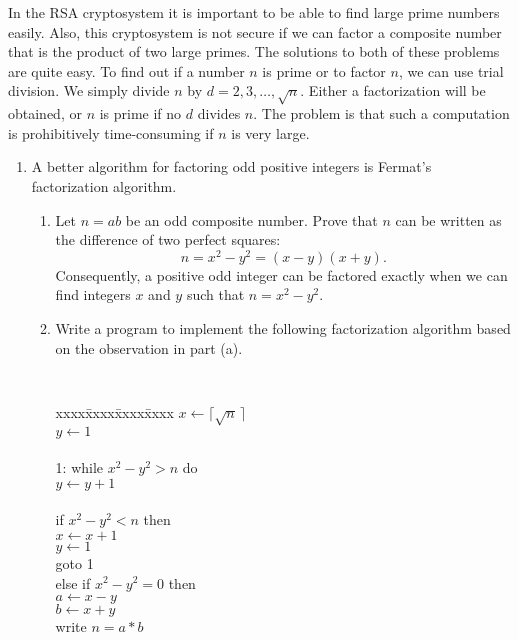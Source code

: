 {\small 
 
 
In the RSA cryptosystem it is important to be able to find
large prime numbers easily.  Also, this cryptosystem is not secure if we
can factor a composite number that is the product of two large primes.
The solutions to both of these problems are quite easy.  To
find out if a number $n$ is prime or to factor $n$, we can use trial
division. We simply divide $n$ by $d = 2, 3, \ldots, \sqrt{n}$.
Either a factorization will be obtained, or $n$ is prime if no $d$
divides $n$.  The problem is that such a computation is prohibitively
time-consuming if $n$ is very large. 
\begin{enumerate}
 
 
\bf\item\rm
A better algorithm for factoring odd positive integers is {\bfi
Fermat's factorization algorithm}. 
\begin{enumerate}
 
\bf\item\rm
Let $n= ab$ be an odd composite number. Prove that $n$ can be written
as the difference of two perfect squares:
$$
n = x^2 - y^2 = (x-y)(x+y).
$$
Consequently, a positive odd integer can be factored exactly when we
can find integers $x$ and $y$ such that $n = x^2 - y^2$.
 
\bf\item\rm
Write a program to implement the following factorization algorithm
based on the observation in part (a).
 
\vspace{1ex}
 
{\tt
\begin{tabbing}
xxxx\=xxxx\=xxxx\=xxxx \kill
\> $x \leftarrow \lceil \sqrt{n}\, \rceil$ \\
\> $y \leftarrow 1$ \\
\mbox{\hspace*{1in}} \\
1: \> while $x^2 - y^2 > n$ do \\
\> \> $y \leftarrow y + 1$ \\
\mbox{\hspace*{1in}} \\
\> if $x^2 - y^2 < n$ then \\
\> \>  $x \leftarrow x + 1$ \\
\> \>  $y \leftarrow 1$ \\
\> \>  goto 1 \\
\> else if $x^2 - y^2 = 0$ then \\
\>  \> $a \leftarrow x-y$ \\
\>  \> $b \leftarrow x+y$ \\
\>  \> write $n = a * b$ 
\end{tabbing}
 
}
\end{enumerate}
\end{enumerate}}
